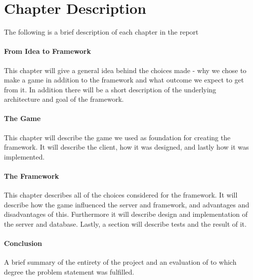 \section{Chapter Description}
The following is a brief description of each chapter in the report

\paragraph{From Idea to Framework}
This chapter will give a general idea behind the choices made - why we chose to make a game in addition to the framework and what outcome we expect to get from it. In addition there will be a short description of the underlying architecture and goal of the framework. 
\paragraph{The Game}
This chapter will describe the game we used as foundation for creating the framework. It will describe the client, how it was designed, and lastly how it was implemented.
\paragraph{The Framework}
This chapter describes all of the choices considered for the framework. It will describe how the game influenced the server and framework, and advantages and disadvantages of this. Furthermore it will describe design and implementation of the server and database. Lastly, a section will describe tests and the result of it.
\paragraph{Conclusion}
A brief summary of the entirety of the project and an evaluation of to which degree the problem statement was fulfilled.
